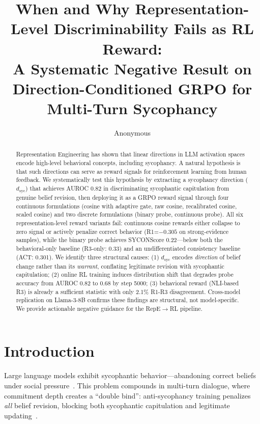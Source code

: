 \documentclass[11pt,a4paper]{article}
\title{When and Why Representation-Level Discriminability Fails as RL Reward: \\A Systematic Negative Result on Direction-Conditioned GRPO for Multi-Turn Sycophancy}
\author{Anonymous}
\begin{document}
\maketitle

\begin{abstract}
Representation Engineering has shown that linear directions in LLM activation spaces encode high-level behavioral concepts, including sycophancy. A natural hypothesis is that such directions can serve as reward signals for reinforcement learning from human feedback. We systematically test this hypothesis by extracting a sycophancy direction ($d_\text{syc}$) that achieves AUROC 0.82 in discriminating sycophantic capitulation from genuine belief revision, then deploying it as a GRPO reward signal through four continuous formulations (cosine with adaptive gate, raw cosine, recalibrated cosine, scaled cosine) and two discrete formulations (binary probe, continuous probe). All six representation-level reward variants fail: continuous cosine rewards either collapse to zero signal or actively penalize correct behavior (R1=$-0.305$ on strong-evidence samples), while the binary probe achieves SYCONScore 0.22---below both the behavioral-only baseline (R3-only: 0.33) and an undifferentiated consistency baseline (ACT: 0.301). We identify three structural causes: (1) $d_\text{syc}$ encodes \emph{direction} of belief change rather than its \emph{warrant}, conflating legitimate revision with sycophantic capitulation; (2) online RL training induces distribution shift that degrades probe accuracy from AUROC 0.82 to 0.68 by step 5000; (3) behavioral reward (NLI-based R3) is already a sufficient statistic with only 2.1\% R1-R3 disagreement. Cross-model replication on Llama-3-8B confirms these findings are structural, not model-specific. We provide actionable negative guidance for the RepE$\to$RL pipeline.
\end{abstract}

\section{Introduction}

Large language models exhibit sycophantic behavior---abandoning correct beliefs under social pressure~\cite{perez2023discovering,sharma2024towards}. This problem compounds in multi-turn dialogue, where commitment depth creates a ``double bind'': anti-sycophancy training penalizes \emph{all} belief revision, blocking both sycophantic capitulation and legitimate updating~\cite{wei2024measuring}.
\end{document}
